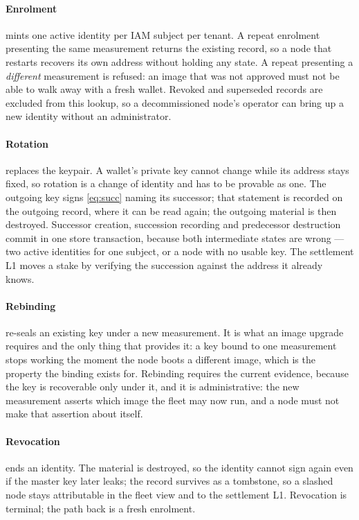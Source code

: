 \documentclass[11pt,a4paper]{article}
\begin{document}
\paragraph{Enrolment} mints one active identity per IAM subject per tenant. A
repeat enrolment presenting the same measurement returns the existing record, so
a node that restarts recovers its own address without holding any state. A
repeat presenting a \emph{different} measurement is refused: an image that was
not approved must not be able to walk away with a fresh wallet. Revoked and
superseded records are excluded from this lookup, so a decommissioned node's
operator can bring up a new identity without an administrator.

\paragraph{Rotation} replaces the keypair. A wallet's private key cannot change
while its address stays fixed, so rotation is a change of identity and has to be
provable as one. The outgoing key signs \eqref{eq:succ} naming its successor;
that statement is recorded on the outgoing record, where it can be read again;
the outgoing material is then destroyed. Successor creation, succession
recording and predecessor destruction commit in one store transaction, because
both intermediate states are wrong --- two active identities for one subject, or
a node with no usable key. The settlement L1 moves a stake by verifying the
succession against the address it already knows.

\paragraph{Rebinding} re-seals an existing key under a new measurement. It is
what an image upgrade requires and the only thing that provides it: a key bound
to one measurement stops working the moment the node boots a different image,
which is the property the binding exists for. Rebinding requires the current
evidence, because the key is recoverable only under it, and it is
administrative: the new measurement asserts which image the fleet may now run,
and a node must not make that assertion about itself.

\paragraph{Revocation} ends an identity. The material is destroyed, so the
identity cannot sign again even if the master key later leaks; the record
survives as a tombstone, so a slashed node stays attributable in the fleet view
and to the settlement L1. Revocation is terminal; the path back is a fresh
enrolment.
\end{document}
